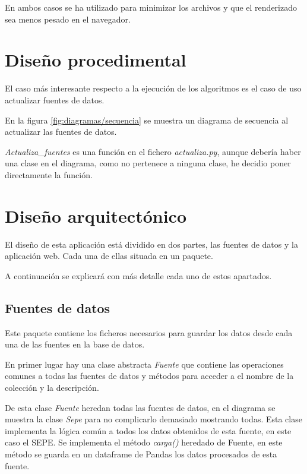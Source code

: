 En ambos casos se ha utilizado  \cite{misc:mapshaper} para minimizar los archivos y que el renderizado sea menos pesado en el navegador.

\section{Diseño procedimental}

El caso más interesante respecto a la ejecución de los algoritmos es el caso de uso actualizar fuentes de datos.

En la figura \ref{fig:diagramas/secuencia} se muestra un diagrama de secuencia al actualizar las fuentes de datos.


\textit{Actualiza\_fuentes} es una función en el fichero \textit{actualiza.py}, aunque debería haber una clase en el diagrama, como no pertenece a ninguna clase, he decidio poner directamente la función.

\section{Diseño arquitectónico}

El diseño de esta aplicación está dividido en dos partes, las fuentes de datos y la aplicación web. Cada una de ellas situada en un paquete.

A continuación se explicará con más detalle cada uno de estos apartados.

\subsection{Fuentes de datos}

Este paquete contiene los ficheros necesarios para guardar los datos desde cada una de las fuentes en la base de datos.

En primer lugar hay una clase abstracta \textit{Fuente} que contiene las operaciones comunes a todas las fuentes de datos y métodos para acceder a el nombre de la colección y la descripción.

De esta clase \textit{Fuente} heredan todas las fuentes de datos, en el diagrama se muestra la clase \textit{Sepe} para no complicarlo demasiado mostrando todas. Esta clase implementa la lógica común a todos los datos obtenidos de esta fuente, en este caso el SEPE. Se implementa el método \textit{carga()} heredado de Fuente, en este método se guarda en un dataframe de Pandas los datos procesados de esta fuente.


